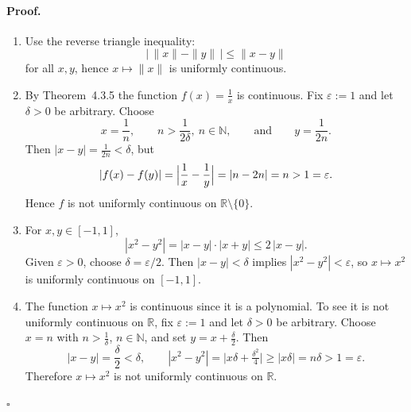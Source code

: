 \documentclass[12pt]{article}
\begin{document}
\paragraph{Proof.}
\begin{enumerate}
  \item Use the reverse triangle inequality:
  \[
    \bigl|\,\|x\|-\|y\|\,\bigr| \le \|x-y\|
  \]
  for all $x,y$, hence $x\mapsto \|x\|$ is uniformly continuous.

  \item By Theorem~4.3.5 the function $f(x)=\frac{1}{x}$ is continuous.  
  Fix $\varepsilon:=1$ and let $\delta>0$ be arbitrary. Choose
  \[
    x=\frac{1}{n},\qquad n>\frac{1}{2\delta},\ n\in\mathbb{N}, 
    \qquad\text{and}\qquad y=\frac{1}{2n}.
  \]
  Then $|x-y|=\frac{1}{2n}<\delta$, but
  \[
    |f(x)-f(y)|=\Bigl|\frac{1}{x}-\frac{1}{y}\Bigr|
    =|n-2n|=n>1=\varepsilon.
  \]
  Hence $f$ is not uniformly continuous on $\mathbb{R}\setminus\{0\}$.

  \item For $x,y\in[-1,1]$,
  \[
    |x^{2}-y^{2}|=|x-y|\cdot|x+y|\le 2\,|x-y|.
  \]
  Given $\varepsilon>0$, choose $\delta=\varepsilon/2$. Then
  $|x-y|<\delta$ implies $|x^{2}-y^{2}|<\varepsilon$, so
  $x\mapsto x^{2}$ is uniformly continuous on $[-1,1]$.

  \item The function $x\mapsto x^{2}$ is continuous since it is a polynomial.
  To see it is not uniformly continuous on $\mathbb{R}$, fix $\varepsilon:=1$
  and let $\delta>0$ be arbitrary. Choose $x=n$ with $n>\frac{1}{\delta}$,
  $n\in\mathbb{N}$, and set $y=x+\frac{\delta}{2}$. Then
  \[
    |x-y|=\frac{\delta}{2}<\delta,\qquad
    |x^{2}-y^{2}|=\bigl|x\delta+\tfrac{\delta^{2}}{4}\bigr|
    \ge |x\delta|=n\delta>1=\varepsilon.
  \]
  Therefore $x\mapsto x^{2}$ is not uniformly continuous on $\mathbb{R}$.
\end{enumerate}
\hfill$\square$
\end{document}
